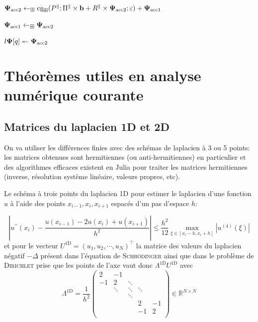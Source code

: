 \documentclass[svgnames,dvipsnames,a4paper,10pt,french]{report}
\begin{document}
\begin{appendices}
\begin{algorithm}
\begin{algorithmic}[1]
\State $\mathbf{\Psi}_{\text{acc}2} \gets_\boxplus  \text{cg}_\boxplus (P^\parallel; \Pi^\parallel \times \mathbf{b} +R^\parallel \times \mathbf{\Psi}_{\text{acc}2}; \varepsilon) + \mathbf{\Psi}_{\text{acc}1}$ 

\State $\mathbf{\Psi}_{\text{acc}1} \gets_\boxplus \mathbf{\Psi}_{\text{acc}2}$ 

\State $l\mathbf{\Psi}[q] \twoheadleftarrow \mathbf{\Psi}_{\text{acc}2}$ 

\EndFor
\EndProcedure
\end{algorithmic}
\end{algorithm}



\chapter{Théorèmes utiles en analyse numérique courante}
\label{ann:rech_elts_propres}



\section{Matrices du laplacien 1D et 2D}

On va utiliser les différences finies avec des schémas de laplacien à 3 ou 5 points: les matrices obtenues sont hermitiennes (ou anti-hermitiennes) en particulier et des algorithmes efficaces existent en Julia pour traiter les matrices hermitiennes (inverse, résolution système linéaire, valeurs propres, etc).

Le schéma à trois points du laplacien 1D pour estimer le laplacien d'une fonction $u$ à l'aide des points $x_{i-1},x_i,x_{i+1}$ espacés d'un pas d'espace $h$:

\begin{equation}
    \left| u^{\prime \prime} (x_i) -  \frac{u(x_{i-1}) - 2 u(x_i) + u(x_{i+1})}{h^2}\right| \le \frac{h^2}{12}\underset{\xi\in[x_i-h,x_i+h]}{\max} |u^{(4)}(\xi) |
\end{equation}
et pour le vecteur $U^{\text{1D}} = (u_1,u_2, \cdots, u_N)^\top$ la matrice des valeurs du laplacien négatif $-\Delta$ présent dans l'équation de \textsc{Schrödinger} ainsi que dans le problème de \textsc{Dirichlet} prise que les points de l'axe vaut donc $\Lambda^{\text{1D}} U^{\text{1D}}$ avec 
\begin{equation}
\Lambda^{\text{1D}} = \frac{1}{h^2} \begin{pmatrix}
2 & -1 &  &  &  \\
-1 & 2 & \ddots &  &  \\
 & \ddots & \ddots & \ddots &  \\
 &  & \ddots &  &  \\
 &  &  & 2 & -1 \\[8pt]
 &  &  & -1 & 2 \\
\end{pmatrix}  \in\mathbb{R}^{N\times N} 
\end{equation}


\end{appendices}
\end{document}
